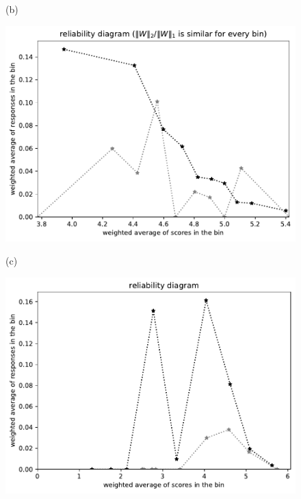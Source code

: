 \documentclass{article}
\newlength{\vertsep}
\newlength{\imsize}
\begin{document}
\begin{figure}
\begin{centering}
(b)
\parbox{\imsize}{\includegraphics[width=\imsize]
{../codes/weighted/County_of_Riverside_vs_Butte-LNGI/equierrs10.pdf}}
\quad\quad
(c)
\parbox{\imsize}{\includegraphics[width=\imsize]
{../codes/weighted/County_of_Riverside_vs_Butte-LNGI/equiscores10.pdf}}

\vspace{\vertsep}


\end{centering}
\end{figure}
\end{document}
